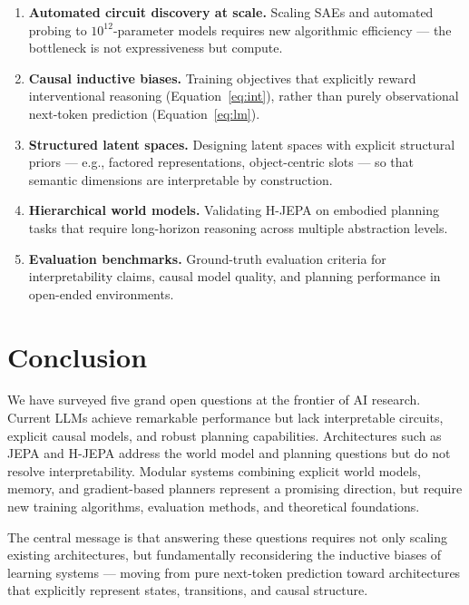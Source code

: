 \documentclass[10pt,twocolumn]{article}
\begin{document}
\begin{enumerate}[leftmargin=1.5em]
\item \textbf{Automated circuit discovery at scale.}
  Scaling SAEs and automated probing to $10^{12}$-parameter models
  requires new algorithmic efficiency — the bottleneck is not
  expressiveness but compute.

\item \textbf{Causal inductive biases.}
  Training objectives that explicitly reward interventional reasoning
  (Equation~\ref{eq:int}), rather than purely observational next-token
  prediction (Equation~\ref{eq:lm}).

\item \textbf{Structured latent spaces.}
  Designing latent spaces with explicit structural priors — e.g.,
  factored representations, object-centric slots — so that semantic
  dimensions are interpretable by construction.

\item \textbf{Hierarchical world models.}
  Validating H-JEPA on embodied planning tasks that require
  long-horizon reasoning across multiple abstraction levels.

\item \textbf{Evaluation benchmarks.}
  Ground-truth evaluation criteria for interpretability claims,
  causal model quality, and planning performance in open-ended
  environments.
\end{enumerate}

\section{Conclusion}
\label{sec:conclusion}

We have surveyed five grand open questions at the frontier of AI
research.  Current LLMs achieve remarkable performance but lack
interpretable circuits, explicit causal models, and robust planning
capabilities.  Architectures such as JEPA and H-JEPA address the
world model and planning questions but do not resolve interpretability.
Modular systems combining explicit world models, memory, and
gradient-based planners represent a promising direction, but require
new training algorithms, evaluation methods, and theoretical foundations.

The central message is that answering these questions requires not
only scaling existing architectures, but fundamentally reconsidering
the inductive biases of learning systems — moving from pure
next-token prediction toward architectures that explicitly represent
states, transitions, and causal structure.
\end{document}
